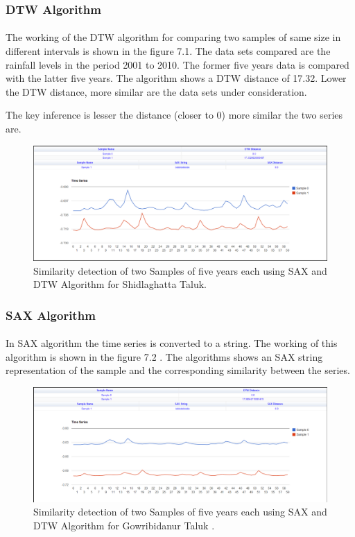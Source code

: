 \documentclass[12pt,a4paper]{report}
\begin{document}
\subsubsection{DTW Algorithm }
\paragraph{} The working of the DTW algorithm for comparing two samples of same size in different intervals is shown in the figure 7.1. The data sets compared are the rainfall levels in the period 2001 to 2010. The former five years data is compared with the latter five years. The algorithm shows a DTW distance of 17.32. Lower the DTW distance, more similar are the data sets under consideration.


The key inference is lesser the distance (closer to 0) more similar the two series are.
\begin{figure}[h!]

  \centering
    \includegraphics[scale=0.35]{./screenshots/result_sim_sax.png}
  \caption{Similarity detection of two Samples of five years each using SAX and DTW  Algorithm for Shidlaghatta Taluk.}
\end{figure}
\subsubsection{SAX Algorithm }
\paragraph{} In SAX algorithm the time series is converted to a string. The working of this algorithm is shown in the figure 7.2 . The algorithms shows an SAX string representation of the sample and the corresponding similarity between the series.
\begin{figure}[h!]

  \centering
    \includegraphics[scale=0.35]{./screenshots/result_sim_sax_2.png}
  \caption{Similarity detection of two Samples of five years each using SAX and DTW  Algorithm for Gowribidanur Taluk .}
\end{figure}
\end{document}
